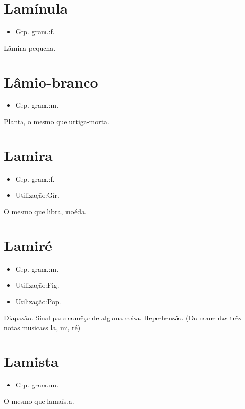 \section{Lamínula}
\begin{itemize}
\item {Grp. gram.:f.}
\end{itemize}
Lâmina pequena.
\section{Lâmio-branco}
\begin{itemize}
\item {Grp. gram.:m.}
\end{itemize}
Planta, o mesmo que \textunderscore urtiga-morta\textunderscore .
\section{Lamira}
\begin{itemize}
\item {Grp. gram.:f.}
\end{itemize}
\begin{itemize}
\item {Utilização:Gír.}
\end{itemize}
O mesmo que \textunderscore libra\textunderscore , moéda.
\section{Lamiré}
\begin{itemize}
\item {Grp. gram.:m.}
\end{itemize}
\begin{itemize}
\item {Utilização:Fig.}
\end{itemize}
\begin{itemize}
\item {Utilização:Pop.}
\end{itemize}
Diapasão.
Sinal para comêço de alguma coisa.
Reprehensão.
(Do nome das três notas musicaes \textunderscore la\textunderscore , \textunderscore mi\textunderscore , \textunderscore ré\textunderscore )
\section{Lamista}
\begin{itemize}
\item {Grp. gram.:m.}
\end{itemize}
O mesmo que \textunderscore lamaísta\textunderscore .
